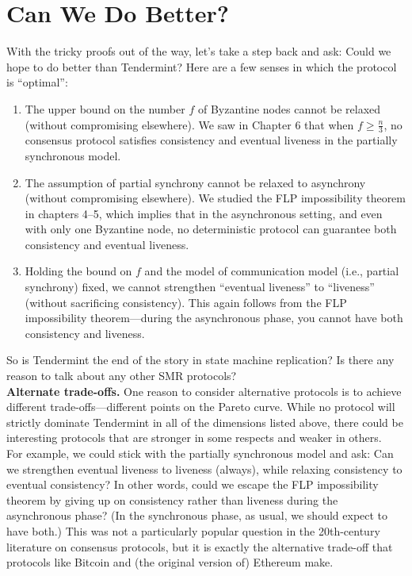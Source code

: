 \section{Can We Do Better?}
With the tricky proofs out of the way, let’s take a step back and ask: Could we hope to do
better than Tendermint? Here are a few senses in which the protocol is “optimal”:
\begin{enumerate}
    \item The upper bound on the number $f$ of Byzantine nodes cannot be relaxed (without
compromising elsewhere). We saw in Chapter 6 that when $f \geq \frac{n}{3}$, no consensus
protocol satisfies consistency and eventual liveness in the partially synchronous model.
    \item The assumption of partial synchrony cannot be relaxed to asynchrony (without compromising elsewhere). We studied the FLP impossibility theorem in chapters 4–5,
which implies that in the asynchronous setting, and even with only one Byzantine
node, no deterministic protocol can guarantee both consistency and eventual liveness.
    \item Holding the bound on $f$ and the model of communication model (i.e., partial synchrony) fixed, we cannot strengthen “eventual liveness” to “liveness” (without sacrificing consistency). This again follows from the FLP impossibility theorem—during the
asynchronous phase, you cannot have both consistency and liveness.
\end{enumerate}
So is Tendermint the end of the story in state machine replication? Is there any reason
to talk about any other SMR protocols?\\

\noindent
\textbf{Alternate trade-offs.} 
One reason to consider alternative protocols is to achieve different
trade-offs—different points on the Pareto curve. While no protocol will strictly dominate
Tendermint in all of the dimensions listed above, there could be interesting protocols that
are stronger in some respects and weaker in others.\\
For example, we could stick with the partially synchronous model and ask: Can we
strengthen eventual liveness to liveness (always), while relaxing consistency to eventual consistency? In other words, could we escape the FLP impossibility theorem by giving up on
consistency rather than liveness during the asynchronous phase? (In the synchronous phase,
as usual, we should expect to have both.) This was not a particularly popular question in
the 20th-century literature on consensus protocols, but it is exactly the alternative trade-off
that protocols like Bitcoin and (the original version of) Ethereum make.\\

